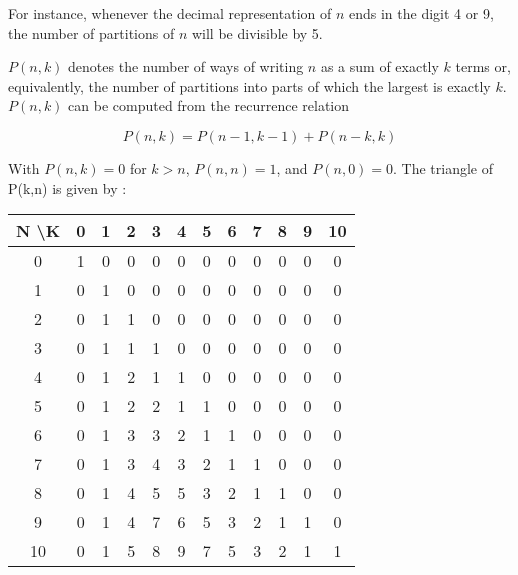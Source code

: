 For instance, whenever the decimal representation of $n$ ends in the digit 4 or 9, the number of partitions of $n$ will be divisible by 5.

$P(n,k)$ denotes the number of ways of writing $n$ as a sum of exactly $k$ terms or, equivalently, the number of partitions into parts of which the largest is exactly $k$. $P(n,k)$ can be computed from the recurrence relation

\begin{equation}
  P(n,k)=P(n-1,k-1)+P(n-k,k)
\end{equation}

With $P(n,k)=0$ for $k>n$, $P(n,n)=1$, and $P(n,0)=0$. The triangle of P(k,n) is given by :

\begin{table}[h]
    \centering
    \begin{tabular}{c|ccccccccccc}
        \toprule
        N \textbackslash K & 0 & 1 & 2 & 3 & 4 & 5 & 6 & 7 & 8 & 9 & 10 \\
        \midrule
        0  & 1 & 0 & 0 & 0 & 0 & 0 & 0 & 0 & 0 & 0 & 0 \\
        1  & 0 & 1 & 0 & 0 & 0 & 0 & 0 & 0 & 0 & 0 & 0 \\
        2  & 0 & 1 & 1 & 0 & 0 & 0 & 0 & 0 & 0 & 0 & 0 \\
        3  & 0 & 1 & 1 & 1 & 0 & 0 & 0 & 0 & 0 & 0 & 0 \\
        4  & 0 & 1 & 2 & 1 & 1 & 0 & 0 & 0 & 0 & 0 & 0 \\
        5  & 0 & 1 & 2 & 2 & 1 & 1 & 0 & 0 & 0 & 0 & 0 \\
        6  & 0 & 1 & 3 & 3 & 2 & 1 & 1 & 0 & 0 & 0 & 0 \\
        7  & 0 & 1 & 3 & 4 & 3 & 2 & 1 & 1 & 0 & 0 & 0 \\
        8  & 0 & 1 & 4 & 5 & 5 & 3 & 2 & 1 & 1 & 0 & 0 \\
        9  & 0 & 1 & 4 & 7 & 6 & 5 & 3 & 2 & 1 & 1 & 0 \\
        10 & 0 & 1 & 5 & 8 & 9 & 7 & 5 & 3 & 2 & 1 & 1 \\
        \bottomrule
    \end{tabular}
\end{table}
